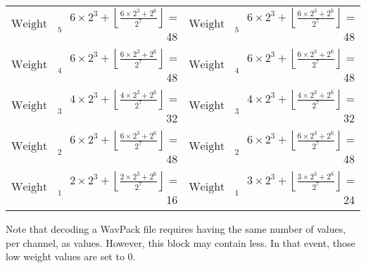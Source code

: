 \begin{table}[h]
\begin{tabular}{r r | r r}
$\text{Weight A}_5$ & $6 \times 2 ^ 3 + \left\lfloor\frac{6 \times 2 ^ 3 + 2 ^ 6}{2 ^ 7}\right\rfloor$ = 48 & $\text{Weight B}_5$ & $6 \times 2 ^ 3 + \left\lfloor\frac{6 \times 2 ^ 3 + 2 ^ 6}{2 ^ 7}\right\rfloor$ = 48 \\
$\text{Weight A}_4$ & $6 \times 2 ^ 3 + \left\lfloor\frac{6 \times 2 ^ 3 + 2 ^ 6}{2 ^ 7}\right\rfloor$ = 48 & $\text{Weight B}_4$ & $6 \times 2 ^ 3 + \left\lfloor\frac{6 \times 2 ^ 3 + 2 ^ 6}{2 ^ 7}\right\rfloor$ = 48 \\
$\text{Weight A}_3$ & $4 \times 2 ^ 3 + \left\lfloor\frac{4 \times 2 ^ 3 + 2 ^ 6}{2 ^ 7}\right\rfloor$ = 32 & $\text{Weight B}_3$ & $4 \times 2 ^ 3 + \left\lfloor\frac{4 \times 2 ^ 3 + 2 ^ 6}{2 ^ 7}\right\rfloor$ = 32 \\
$\text{Weight A}_2$ & $6 \times 2 ^ 3 + \left\lfloor\frac{6 \times 2 ^ 3 + 2 ^ 6}{2 ^ 7}\right\rfloor$ = 48 & $\text{Weight B}_2$ & $6 \times 2 ^ 3 + \left\lfloor\frac{6 \times 2 ^ 3 + 2 ^ 6}{2 ^ 7}\right\rfloor$ = 48 \\
$\text{Weight A}_1$ & $2 \times 2 ^ 3 + \left\lfloor\frac{2 \times 2 ^ 3 + 2 ^ 6}{2 ^ 7}\right\rfloor$ = 16 & $\text{Weight B}_1$ & $3 \times 2 ^ 3 + \left\lfloor\frac{3 \times 2 ^ 3 + 2 ^ 6}{2 ^ 7}\right\rfloor$ = 24 \\
\end{tabular}
\end{table}
\par
\noindent
Note that decoding a WavPack file requires having the same
number of  values, per channel, as
 values.
However, this block may contain less.
In that event, those low weight values are set to 0.

\clearpage

